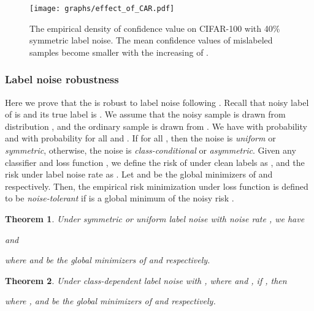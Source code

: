 \documentclass{article}
\newtheorem{theorem}{Theorem}
\begin{document}
\begin{figure}[t]
	\begin{center}
		\texttt{[image: graphs/effect\_of\_CAR.pdf]}
	\end{center}
	\caption{The empirical density of confidence value  on CIFAR-100 with 40\% symmetric label noise. The mean confidence values of mislabeled samples become smaller with the increasing of .}
	\label{fig:effect_of_CAR}
	\vspace{-0.5em}
\end{figure}


























\subsubsection{Label noise robustness}
Here we prove that the  is robust to label noise following \cite{ghosh2017robust}. Recall that noisy label of  is  and its true label is . We assume that the noisy sample  is drawn from distribution , and the ordinary sample  is drawn from . We have   with probability  and  with probability  for all  and . If  for all , then the noise is \emph{uniform} or \emph{symmetric}, otherwise, the noise is \emph{class-conditional} or \emph{asymmetric}. Given any classifier  and loss function , we define the risk of  under clean labels as , and the risk under label noise rate  as . Let  and  be the global minimizers of  and  respectively. Then, the empirical risk minimization under loss function  is defined to be \emph{noise-tolerant} if  is a global minimum of the noisy risk .


\begin{theorem}
	\label{theroem:1}
	Under symmetric or uniform label noise with noise rate , we have  
	
	and 
	
	where  and  be the global minimizers of  and  respectively.
\end{theorem}

\begin{theorem}
	\label{theorem:2}
	Under class-dependent label noise with , where  and , if , then
	
	where ,  and  be the global minimizers of  and  respectively. 
	
\end{theorem}
\end{document}
